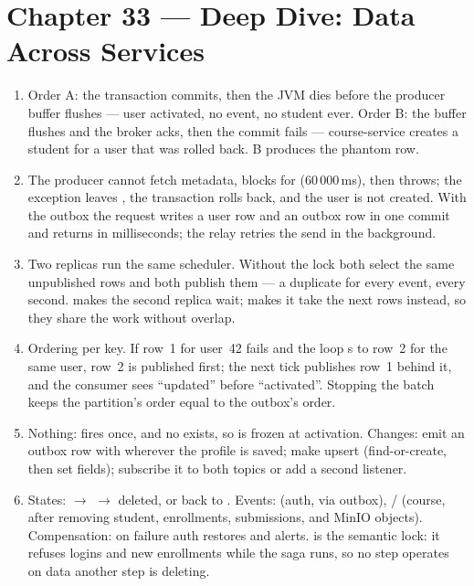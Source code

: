 \section*{Chapter 33 --- Deep Dive: Data Across Services}
\begin{enumerate}
  \item Order A: the transaction commits, then the JVM dies before the
  producer buffer flushes --- user activated, no event, no student
  ever. Order B: the buffer flushes and the broker acks, then the
  commit fails --- course-service creates a student for a user that
  was rolled back. B produces the phantom row.
  \item The producer cannot fetch metadata, blocks for
   (60\,000\,ms), then throws; the exception leaves
  , the transaction rolls back, and the user is not
  created. With the outbox the request writes a user row and an outbox
  row in one commit and returns in milliseconds; the relay retries the
  send in the background.
  \item Two replicas run the same scheduler. Without the lock both
  select the same unpublished rows and both publish them --- a
  duplicate for every event, every second.  makes the
  second replica wait;  makes it take the next rows
  instead, so they share the work without overlap.
  \item Ordering per key. If row~1 for user~42 fails and the loop
  s to row~2 for the same user, row~2 is published
  first; the next tick publishes row~1 behind it, and the consumer sees
  ``updated'' before ``activated''. Stopping the batch keeps the
  partition's order equal to the outbox's order.
  \item Nothing:  fires once, and no
   exists, so  is frozen at
  activation. Changes: emit an outbox row with
   wherever the profile is saved; make
   upsert (find-or-create, then set
  fields); subscribe it to both topics or add a second listener.
  \item States:  $\rightarrow$ 
  $\rightarrow$ deleted, or back to . Events:
   (auth, via outbox),
   /  (course,
  after removing student, enrollments, submissions, and MinIO objects).
  Compensation: on failure auth restores  and alerts.
   is the semantic lock: it refuses logins and new
  enrollments while the saga runs, so no step operates on data another
  step is deleting.
\end{enumerate}

